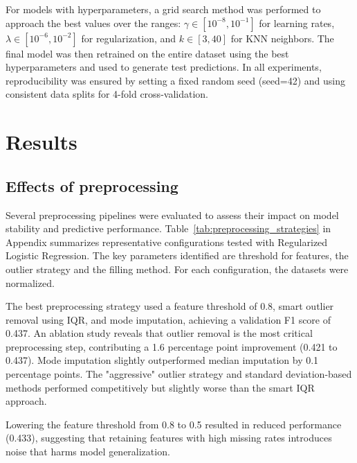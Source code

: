 \documentclass[10pt,conference,compsocconf]{IEEEtran}
\begin{document}
For models with hyperparameters, a grid search method was performed to approach the best values over the ranges: $\gamma \in [10^{-8}, 10^{-1}]$ for learning rates, $\lambda \in [10^{-6}, 10^{-2}]$ for regularization, and $k \in [3, 40]$ for KNN neighbors. The final model was then retrained on the entire dataset using the best hyperparameters and used to generate test predictions. In all experiments, reproducibility was ensured by setting a fixed random seed (seed=42) and using consistent data splits for 4-fold cross-validation.

\section{Results}
\label{sec:results}

\subsection{Effects of preprocessing}
Several preprocessing pipelines were evaluated to assess their impact on model stability and predictive performance. Table~\ref{tab:preprocessing_strategies} in Appendix summarizes representative configurations tested with Regularized Logistic Regression. The key parameters identified are threshold for features, the outlier strategy and the filling method. For each configuration, the datasets were normalized.

The best preprocessing strategy used a feature threshold of 0.8, smart outlier removal using IQR, and mode imputation, achieving a validation F1 score of 0.437. An ablation study reveals that outlier removal is the most critical preprocessing step, contributing a 1.6 percentage point improvement (0.421 to 0.437). Mode imputation slightly outperformed median imputation by 0.1 percentage points. The "aggressive" outlier strategy and standard deviation-based methods performed competitively but slightly worse than the smart IQR approach.

Lowering the feature threshold from 0.8 to 0.5 resulted in reduced performance (0.433), suggesting that retaining features with high missing rates introduces noise that harms model generalization.
\end{document}
